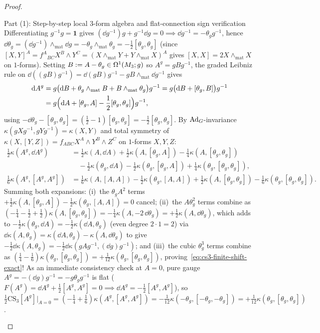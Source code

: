 \begin{proof}\leavevmode
\begin{proofpart}{Part (1): Step-by-step local $3$-form algebra and flat-connection sign verification}
Differentiating $g^{-1}g = \mathbf{1}$ gives $(\dd g^{-1})g + g^{-1}\dd g = 0 \implies \dd g^{-1} = -\theta_g g^{-1}$, hence $\dd\theta_g = (\dd g^{-1})\wedge_{\mathrm{mat}}\dd g = -\theta_g\wedge_{\mathrm{mat}}\theta_g = -\frac{1}{2}[\theta_g,\theta_g]$ (since $[X,Y]^A = f^A{}_{BC}X^B\wedge Y^C = (X\wedge_{\mathrm{mat}}Y + Y\wedge_{\mathrm{mat}}X)^A$ gives $[X,X] = 2X\wedge_{\mathrm{mat}}X$ on $1$-forms). Setting $B := A - \theta_g \in \Omega^1(M_3;g)$ so $A^g = g B g^{-1}$, the graded Leibniz rule on $\dd((g B)g^{-1}) = \dd(g B)g^{-1} - g B\wedge_{\mathrm{mat}}\dd g^{-1}$ gives
\[
\begin{aligned}
\mathrm{d} A^g &= g\bigl(\mathrm{d} B + \theta_g\wedge_{\mathrm{mat}}B + B\wedge_{\mathrm{mat}}\theta_g\bigr)g^{-1} = g\bigl(\mathrm{d} B + [\theta_g, B]\bigr)g^{-1}\\
&= g\Bigl(\mathrm{d} A + [\theta_g, A] - \frac{1}{2}[\theta_g,\theta_g]\Bigr)g^{-1},
\end{aligned}
\]
using $-\dd\theta_g - [\theta_g,\theta_g] = (\frac{1}{2} - 1)[\theta_g,\theta_g] = -\frac{1}{2}[\theta_g,\theta_g]$. By $\operatorname{Ad}_G$-invariance $\kappa(g X g^{-1}, g Y g^{-1}) = \kappa(X,Y)$ and total symmetry of $\kappa(X,[Y,Z]) = f_{ABC}X^A\wedge Y^B\wedge Z^C$ on $1$-forms $X,Y,Z$:
\[
\begin{aligned}
\tfrac{1}{2}\kappa(A^g, \dd A^g) &= \tfrac{1}{2}\kappa(A,\dd A) + \tfrac{1}{2}\kappa(A,[\theta_g,A]) - \tfrac{1}{4}\kappa(A,[\theta_g,\theta_g])\\
&\quad - \tfrac{1}{2}\kappa(\theta_g,\dd A) - \tfrac{1}{2}\kappa(\theta_g,[\theta_g,A]) + \tfrac{1}{4}\kappa(\theta_g,[\theta_g,\theta_g]),\\
\tfrac{1}{6}\kappa(A^g, [A^g,A^g]) &= \tfrac{1}{6}\kappa(A,[A,A]) - \tfrac{1}{2}\kappa(\theta_g,[A,A]) + \tfrac{1}{2}\kappa(A,[\theta_g,\theta_g]) - \tfrac{1}{6}\kappa(\theta_g,[\theta_g,\theta_g]).
\end{aligned}
\]
Summing both expansions: (i)~the $\theta_g A^2$ terms $+\frac{1}{2}\kappa(A,[\theta_g,A]) - \frac{1}{2}\kappa(\theta_g,[A,A]) = 0$ cancel; (ii)~the $A\theta_g^2$ terms combine as $(-\frac{1}{4}-\frac{1}{2}+\frac{1}{2})\kappa(A,[\theta_g,\theta_g]) = -\frac{1}{4}\kappa(A,-2\,\dd\theta_g) = +\frac{1}{2}\kappa(A,\dd\theta_g)$, which adds to $-\frac{1}{2}\kappa(\theta_g,\dd A) = -\frac{1}{2}\kappa(\dd A,\theta_g)$ (even degree $2\cdot 1 = 2$) via $\dd\kappa(A,\theta_g) = \kappa(\dd A,\theta_g) - \kappa(A,\dd\theta_g)$ to give $-\frac{1}{2}\dd\kappa(A,\theta_g) = -\frac{1}{2}\dd\kappa(g A g^{-1},(\dd g)g^{-1})$; and (iii)~the cubic $\theta_g^3$ terms combine as $(\frac{1}{4}-\frac{1}{6})\kappa(\theta_g,[\theta_g,\theta_g]) = +\frac{1}{12}\kappa(\theta_g,[\theta_g,\theta_g])$, proving~\eqref{eq:cs3-finite-shift-exact}! As an immediate consistency check at $A = 0$, pure gauge $A^g = -(\dd g)g^{-1} = -g\theta_g g^{-1}$ is flat ($F(A^g) = \dd A^g + \frac{1}{2}[A^g,A^g] = 0 \implies \dd A^g = -\frac{1}{2}[A^g,A^g]$), so $\frac{1}{2}\mathrm{CS}_3[A^g]|_{A=0} = (-\frac{1}{4}+\frac{1}{6})\kappa(A^g,[A^g,A^g]) = -\frac{1}{12}\kappa(-\theta_g,[-\theta_g,-\theta_g]) = +\frac{1}{12}\kappa(\theta_g,[\theta_g,\theta_g])$.

\end{proofpart}
\end{proof}
